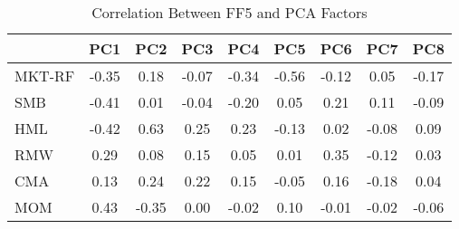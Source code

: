 \begin{table}
\centering
\caption{Correlation Between FF5 and PCA Factors}
\label{tab:pca_ffdaily_corr}
\begin{tabular}{lcccccccc}
\toprule
{} &   PC1 &   PC2 &   PC3 &   PC4 &   PC5 &   PC6 &   PC7 &   PC8 \\
\midrule
MKT-RF & -0.35 &  0.18 & -0.07 & -0.34 & -0.56 & -0.12 &  0.05 & -0.17 \\
SMB    & -0.41 &  0.01 & -0.04 & -0.20 &  0.05 &  0.21 &  0.11 & -0.09 \\
HML    & -0.42 &  0.63 &  0.25 &  0.23 & -0.13 &  0.02 & -0.08 &  0.09 \\
RMW    &  0.29 &  0.08 &  0.15 &  0.05 &  0.01 &  0.35 & -0.12 &  0.03 \\
CMA    &  0.13 &  0.24 &  0.22 &  0.15 & -0.05 &  0.16 & -0.18 &  0.04 \\
MOM    &  0.43 & -0.35 &  0.00 & -0.02 &  0.10 & -0.01 & -0.02 & -0.06 \\
\bottomrule
\end{tabular}
\end{table}

